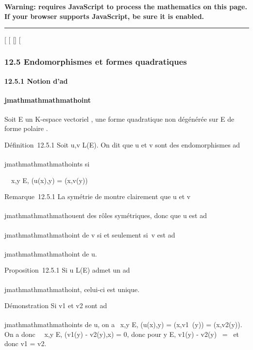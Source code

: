 \textbf{Warning: 
requires JavaScript to process the mathematics on this page.\\ If your
browser supports JavaScript, be sure it is enabled.}

\begin{center}\rule{3in}{0.4pt}\end{center}

{[}
{[}
{[}{]}
{[}

\subsubsection{12.5 Endomorphismes et formes quadratiques}

\paragraph{12.5.1 Notion d'ad\\\\jmathmathmathmathoint}

Soit E un K-espace vectoriel , \Phi une forme quadratique non dégénérée sur
E de forme polaire \phi.

Définition~12.5.1 Soit u,v \in L(E). On dit que u et v sont des
endomorphismes ad\\\\jmathmathmathmathoints si

\forall~~x,y \in E, \phi(u(x),y) = \phi(x,v(y))

Remarque~12.5.1 La symétrie de \phi montre clairement que u et v \\\\jmathmathmathmathouent des
rôles symétriques, donc que u est ad\\\\jmathmathmathmathoint de v si et seulement si~v est
ad\\\\jmathmathmathmathoint de u.

Proposition~12.5.1 Si u \in L(E) admet un ad\\\\jmathmathmathmathoint, celui-ci est unique.

Démonstration Si v1 et v2 sont ad\\\\jmathmathmathmathoints de u, on a
\forall~x,y \in E, \phi(u(x),y) = \phi(x,v1~(y)) =
\phi(x,v2(y)). On a donc \forall~~x,y \in E,
\phi(v1(y) - v2(y),x) = 0, donc pour y \in E,
v1(y) - v2(y)
\in\mathrmKer~\phi =
\0\ et donc v1 =
v2.

